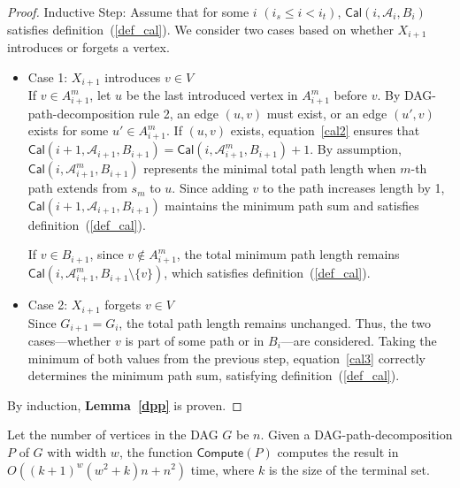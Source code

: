 \documentclass[runningheads]{llncs}
\theoremstyle{plain}
\theoremstyle{definition}
\begin{document}
\begin{proof}
    Inductive Step: Assume that for some $i$ $(i_s \leq i < i_t)$, $\mathsf{Cal}(i, \mathscr{A}_i, B_i)$ satisfies definition~(\ref{def_cal}). We consider two cases based on whether $X_{i+1}$ introduces or forgets a vertex.

    \begin{itemize}
        \item Case 1: $X_{i+1}$ introduces $v \in V$
        \\
        If $v \in A^m_{i+1}$, let $u$ be the last introduced vertex in $A^m_{i+1}$ before $v$. By DAG-path-decomposition rule 2, an edge $(u, v)$ must exist, or an edge $(u', v)$ exists for some $u' \in A^m_{i+1}$. If $(u, v)$ exists, equation~\ref{cal2} ensures that $\mathsf{Cal}(i+1, \mathscr{A}_{i+1}, B_{i+1}) = \mathsf{Cal}(i, \mathscr{A}^m_{i+1}, B_{i+1}) + 1$. By assumption, $\mathsf{Cal}(i, \mathscr{A}^m_{i+1}, B_{i+1})$ represents the minimal total path length when $m$-th path extends from $s_m$ to $u$. Since adding $v$ to the path increases length by 1, $\mathsf{Cal}(i+1, \mathscr{A}_{i+1}, B_{i+1})$ maintains the minimum path sum and satisfies definition~(\ref{def_cal}).
    
        If $v \in B_{i+1}$, since $v \notin A^m_{i+1}$, the total minimum path length remains $\mathsf{Cal}(i, \mathscr{A}^m_{i+1}, B_{i+1} \setminus \{v\})$, which satisfies definition~(\ref{def_cal}).
        
        \item Case 2: $X_{i+1}$ forgets $v \in V$
        \\
        Since $G_{i+1} = G_i$, the total path length remains unchanged. Thus, the two cases—whether $v$ is part of some path or in $B_i$—are considered. Taking the minimum of both values from the previous step, equation~\ref{cal3} correctly determines the minimum path sum, satisfying definition~(\ref{def_cal}).
    \end{itemize}
    By induction, \textbf{Lemma~\ref{dpp}} is proven.
\end{proof}


\begin{lemma}
    Let the number of vertices in the DAG $G$ be $n$. Given a DAG-path-decomposition $P$ of $G$ with width $w$, the function $\mathsf{Compute}(P)$ computes the result in $O((k+1)^w(w^2+k)n+n^2)$ time, where $k$ is the size of the terminal set.
\end{lemma}
\end{document}
